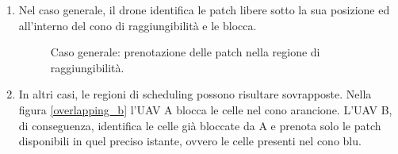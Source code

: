 \begin{enumerate} [label=(\alph*)]
    \item Nel caso generale, il drone identifica le patch libere sotto la sua posizione ed all'interno del cono di raggiungibilità e le blocca.
    \begin{figure}[H] 
        \captionsetup{justification=centering, margin=2cm, font=footnotesize}
        \begin{center}
        \end{center}
        \caption{Caso generale: prenotazione delle patch nella regione di raggiungibilità.}
        \label{overlapping_a}
    \end{figure}
    \item In altri casi, le regioni di scheduling possono risultare sovrapposte.
    Nella figura \ref{overlapping_b} l'UAV A blocca le celle nel cono arancione.
    L'UAV B, di conseguenza, identifica le celle già bloccate da A e prenota solo le patch disponibili in quel preciso istante, ovvero le celle presenti nel cono blu.
    \begin{figure}[H] 
        \captionsetup{justification=centering, margin=2cm, font=footnotesize}
        \begin{center}

\end{center}
\end{figure}
\end{enumerate}

